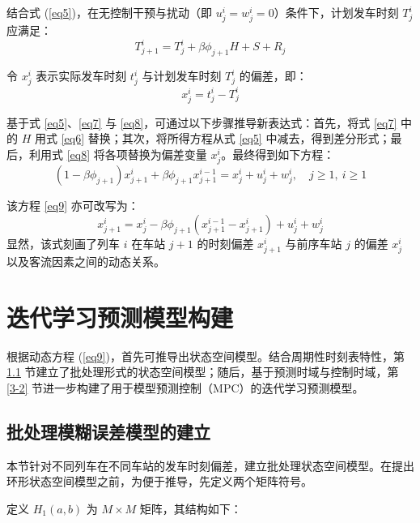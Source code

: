 结合式 (\ref{eq5})，在无控制干预与扰动（即 $u_{j}^{i}=w_{j}^{i}=0$）条件下，计划发车时刻 $T_{j}^{i}$ 应满足：
\begin{equation}
    T_{j+1}^{i}=T_{j}^{i}+\beta \phi_{j+1}H+S+R_{j}
\label{eq7}
\end{equation}

令 $x_{j}^{i}$ 表示实际发车时刻 $t_j^i$ 与计划发车时刻 $T_j^i$ 的偏差，即：
\begin{equation}
    x_{j}^{i}=t_{j}^{i}-T_{j}^{i}  
\label{eq8}
\end{equation}

基于式 \eqref{eq5}、\eqref{eq7} 与 \eqref{eq8}，可通过以下步骤推导新表达式：首先，将式 \eqref{eq7} 中的 $H$ 用式 \eqref{eq6} 替换；其次，将所得方程从式 \eqref{eq5} 中减去，得到差分形式；最后，利用式 \eqref{eq8} 将各项替换为偏差变量 $x_j^i$。最终得到如下方程：
\begin{equation}
    (1-\beta \phi_{j+1})x_{j+1}^{i}+\beta \phi_{j+1}x_{j+1}^{i-1}=x_{j}^{i}+u_{j}^{i}+w_{j}^{i},\quad j\geq1,\ i\geq1
\label{eq9}
\end{equation}

该方程 \eqref{eq9} 亦可改写为：
\begin{equation*}
	x_{j+1}^i=x_j^i-\beta \phi_{j+1}\left(x_{j+1}^{i-1}-x_{j+1}^i\right)+u_j^i+w_j^i
\end{equation*}
显然，该式刻画了列车 $i$ 在车站 $j+1$ 的时刻偏差 $x_{j+1}^i$ 与前序车站 $j$ 的偏差 $x_j^i$ 以及客流因素之间的动态关系。
\label{5.1}

\section{迭代学习预测模型构建}
\label{section3}

根据动态方程 (\ref{eq9})，首先可推导出状态空间模型。结合周期性时刻表特性，第 \ref{3-1} 节建立了批处理形式的状态空间模型；随后，基于预测时域与控制时域，第 \ref{3-2} 节进一步构建了用于模型预测控制（MPC）的迭代学习预测模型。

\subsection{批处理模糊误差模型的建立}
\label{3-1}

本节针对不同列车在不同车站的发车时刻偏差，建立批处理状态空间模型。在提出环形状态空间模型之前，为便于推导，先定义两个矩阵符号。

定义 $H_{1}(a,b)$ 为 $M \times M$ 矩阵，其结构如下：


